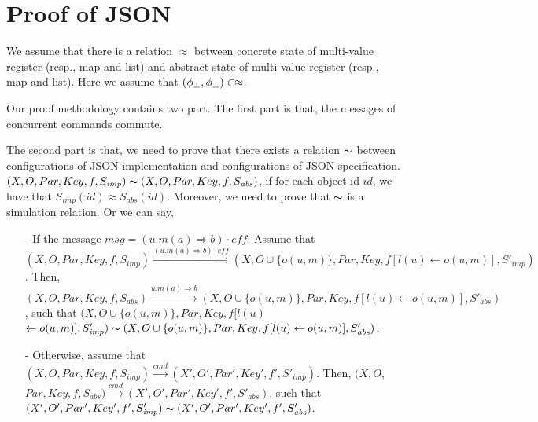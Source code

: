 



\section{Proof of JSON}
\label{sec:proof of JSON} 

We assume that there is a relation $\approx$ between concrete state of multi-value register (resp., map and list) and abstract state of multi-value register (resp., map and list). Here we assume that $(\phi_{\bot},\phi_{\bot}) \in \approx$. 

Our proof methodology contains two part. The first part is that, the messages of concurrent commands commute. 

The second part is that, we need to prove that there exists a relation $\thicksim$ between configurations of JSON implementation and configurations of JSON specification. $(X,O,Par,Key,f,S_{\mathit{imp}}) \thicksim (X,O,Par,Key,f,S_{\mathit{abs}})$, if for each object id $\mathit{id}$, we have that $S_{\mathit{imp}}(\mathit{id}) \approx S_{\mathit{abs}}(\mathit{id})$. Moreover, we need to prove that $\thicksim$ is a simulation relation. Or we can say,  

\begin{itemize}
\setlength{\itemsep}{0.5pt}
\item[-] If the message $\mathit{msg} = (u.m(a)\Rightarrow b) \cdot \mathit{eff}$: Assume that $(X,O,Par,Key,f,S_{\mathit{imp}}) \xrightarrow{(u.m(a)\Rightarrow b) \cdot \mathit{eff}} (X,O \cup \{ o(u,m) \},Par,Key,f[l(u) \leftarrow o(u,m)],S'_{\mathit{imp}})$. Then, $(X,O,Par,Key,f,S_{\mathit{abs}}) \xrightarrow{u.m(a)\Rightarrow b} (X,O \cup \{ o(u,m) \},Par,Key,f[l(u) \leftarrow o(u,m)],S'_{\mathit{abs}})$, such that $(X,O \cup \{ o(u,m) \},Par,Key,f[l(u)$ $\leftarrow o(u,m)],S'_{\mathit{imp}}) \thicksim (X,O \cup \{ o(u,m) \},Par,Key,f[l(u) \leftarrow o(u,m)],S'_{\mathit{abs}})$. 

\item[-] Otherwise, assume that $(X,O,Par,Key,f,S_{\mathit{imp}}) \xrightarrow{\mathit{cmd}} (X',O',Par',Key',f',S'_{\mathit{imp}})$. Then, $(X,O$, $Par,Key,f,S_{\mathit{abs}}) \xrightarrow{\mathit{cmd}} (X',O',Par',Key',f',S'_{\mathit{abs}})$, such that $(X',O',Par',Key',f',S'_{\mathit{imp}}) \thicksim (X',O',Par',Key',f',S'_{\mathit{abs}})$. 
\end{itemize}






